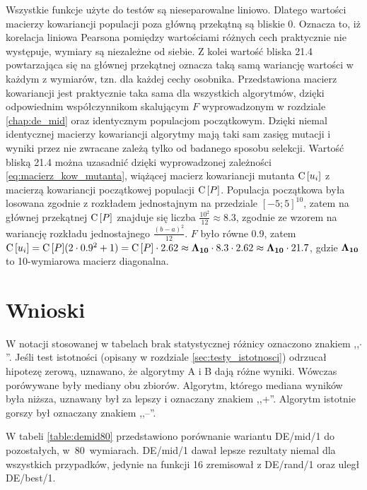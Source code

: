 \documentclass[a4paper,onecolumn,oneside,12pt,wide,floatssmall]{mwrep}
\def\C{{\rm C}\,}
\theoremstyle{definition}
\theoremstyle{plain}%
\theoremstyle{remark}
\begin{document}
Wszystkie funkcje użyte do testów są nieseparowalne liniowo.
Dlatego wartości macierzy kowariancji populacji poza główną przekątną są bliskie 0. Oznacza to,
iż korelacja liniowa Pearsona pomiędzy wartościami różnych cech praktycznie nie występuje, wymiary
są niezależne od siebie. Z kolei wartość bliska 21.4 powtarzająca się na głównej przekątnej 
oznacza taką samą wariancję wartości w każdym z wymiarów, tzn. dla każdej cechy osobnika.
Przedstawiona macierz kowariancji jest praktycznie taka sama dla wszystkich algorytmów, 
dzięki odpowiednim współczynnikom skalującym
$F$ wyprowadzonym w rozdziale \ref{chap:de_mid} oraz identycznym populacjom początkowym. 
Dzięki niemal identycznej macierzy kowariancji algorytmy
mają taki sam zasięg mutacji i wyniki przez nie zwracane zależą tylko od badanego sposobu selekcji.
Wartość bliską 21.4 można uzasadnić dzięki wyprowadzonej zależności \eqref{eq:macierz_kow_mutanta},
wiążącej macierz kowariancji mutanta $\C[u_i]$
z macierzą kowariancji początkowej populacji $\C[P]$. Populacja początkowa była losowana zgodnie z 
rozkładem jednostajnym na przedziale $[-5;5]^{10}$, zatem na głównej przekątnej $\C[P]$
znajduje się liczba $\frac{10^2}{12} \approx 8.3$, zgodnie ze wzorem na wariancję rozkładu jednostajnego 
$\frac{(b - a)^2}{12}$. $F$ było równe 0.9, zatem 
$\C[u_i] = \C[P](2 \cdot 0.9^2 + 1) = \C[P] \cdot 2.62 \approx \bold{\Lambda_{10}} \cdot 8.3 \cdot 2.62 \approx \bold{\Lambda_{10}} \cdot 21.7$, gdzie $\bold{\Lambda_{10}}$
to 10-wymiarowa macierz diagonalna. 

\section{Wnioski}

W notacji stosowanej w tabelach brak statystycznej różnicy oznaczono znakiem ,,$\cdotp$''.
Jeśli test istotności (opisany w rozdziale \ref{sec:testy_istotnosci})
odrzucał hipotezę zerową, uznawano, że algorytmy A i B dają różne wyniki.
Wówczas porówywane były mediany obu zbiorów. Algorytm, którego mediana wyników była niższa,
uznawany był za lepszy i oznaczany znakiem ,,+''. Algorytm istotnie gorszy był oznaczany znakiem ,,--''.

W tabeli \ref{table:demid80} przedstawiono porównanie wariantu DE/mid/1 do pozostałych, w~80~wymiarach.
DE/mid/1 dawał lepsze rezultaty niemal dla wszystkich przypadków, jedynie na funkcji 16 zremisował z DE/rand/1
oraz uległ DE/best/1.
\end{document}
